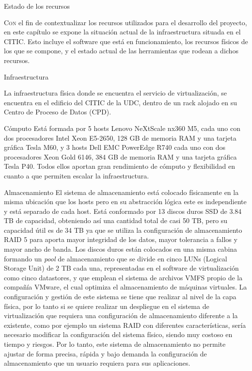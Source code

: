 \begin{chapter}{Estado de los recursos}
\label{chap:estado-recursos-CITIC-VCF}

\lettrine{C}{on} el fin de contextualizar los recursos utilizados para el desarrollo del proyecto, en este capítulo se expone la situación actual de la infraestructura situada en el CITIC. Esto incluye el software que está en funcionamiento, los recursos físicos de los que se compone, y el estado actual de las herramientas que rodean a dichos recursos.

\begin{section}{Infraestructura}

    La infraestructura física donde se encuentra el servicio de virtualización, se encuentra en el edificio del CITIC de la UDC, dentro de un rack alojado en su Centro de Proceso de Datos (CPD)\cite{citicUDC}.
\begin{subsection}{Cómputo}
    Está formada por 5 hosts Lenovo NeXtScale nx360 M5, cada uno con dos procesadores Intel Xeon E5-2650, 128 GB de memoria RAM y una tarjeta gráfica Tesla M60,  y 3 hosts Dell EMC PowerEdge R740 cada uno con dos procesadores Xeon Gold 6146, 384 GB de memoria RAM y una tarjeta gráfica Tesla P40. Todos ellos aportan gran rendimiento de cómputo y flexibilidad en cuanto a que permiten escalar la infraestructura.
\end{subsection}
\begin{subsection}{Almacenamiento}
    El sistema de almacenamiento está colocado físicamente en la misma ubicación que los hosts pero en su abstracción lógica este es independiente y está separado de cada host. Está conformado por 13 discos duros SSD de 3.84 TB de capacidad, obteniendo así una cantidad total de casi 50 TB, pero su capacidad útil es de 34 TB ya que se utiliza la configuración de almacenamiento RAID 5 para aporta mayor integridad de los datos, mayor tolerancia a fallos y mayor ancho de banda. Los discos duros están colocados en una misma cabina formando un \textit{pool} de almacenamiento que se divide en cinco LUNs (Logical Storage Unit) de 2 TB cada una, representadas en el software de virtualización como cinco datastores, y que emplean el sistema de archivos VMFS propio de la compañía VMware, el cual optimiza el almacenamiento de máquinas virtuales.
    La configuración y gestión de este sistema se tiene que realizar al nivel de la capa física, por lo tanto si se quiere realizar un despliegue en el sistema de virtualización que requiera una configuración de almacenamiento diferente a la existente, como por ejemplo un sistema RAID con diferentes características, sería necesario modificar la configuración del sistema físico, siendo muy costoso en tiempo y riesgos. Por lo tanto, este sistema de almacenamiento no permite ajustar de forma precisa, rápida y bajo demanda la configuración de almacenamiento que un usuario requiera para sus aplicaciones.
\end{subsection}


\end{section}
\end{chapter}
